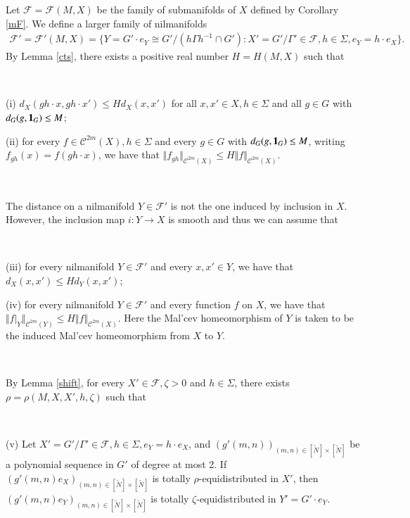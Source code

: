 \documentclass[12pt,amstex]{amsart}
\theoremstyle{definition}
\begin{document}
Let $\mathcal{F}=\mathcal{F}(M,X)$ be the family of submanifolds of $X$ defined by Corollary \ref{mF}. We define a larger family of nilmanifolds
  \begin{equation}\nonumber
   \begin{split}
     \mathcal{F}'=\mathcal{F}'(M,X)=\{Y=G'\cdot e_{Y}\cong G'/(h\Gamma h^{-1}\cap G')\colon X'=G'/\Gamma'\in\mathcal{F}, h\in\Sigma, e_{Y}=h\cdot e_{X}\}.
   \end{split}
  \end{equation}
By Lemma \ref{cts}, there exists a positive real number $H=H(M,X)$ such that

\

(i) $d_{X}(gh\cdot x,gh\cdot x')\leq Hd_{X}(x,x')$ for all $x,x'\in X, h\in\Sigma$ and all $g\in G$ with $d_{G}(g,\bold{1}_{G})\leq M$;

(ii) for every $f\in\mathcal{C}^{2m}(X), h\in\Sigma$ and every $g\in G$ with $d_{G}(g,\bold{1}_{G})\leq M$, writing $f_{gh}(x)=f(gh\cdot x)$, we have that $\Vert f_{gh}\Vert_{\mathcal{C}^{2m}(X)}\leq H\Vert f\Vert_{\mathcal{C}^{2m}(X)}$.

\

The distance on a nilmanifold $Y\in\mathcal{F}'$ is not the one induced by inclusion in $X$. However, the inclusion map $i\colon Y\rightarrow X$ is smooth and thus we can assume that

\

(iii) for every nilmanifold $Y\in\mathcal{F}'$ and every $x,x'\in Y$, we have that $d_{X}(x,x')\leq H d_{Y}(x,x')$;

(iv) for every nilmanifold $Y\in\mathcal{F}'$ and every function $f$ on $X$, we have that $\Vert f|_{Y}\Vert_{\mathcal{C}^{2m}(Y)}\leq H\Vert f\Vert_{\mathcal{C}^{2m}(X)}$. Here the Mal'cev homeomorphism of $Y$ is taken to be the induced Mal'cev homeomorphism from $X$ to $Y$.

\

By Lemma \ref{shift}, for every $X'\in\mathcal{F},\zeta>0$ and $h\in\Sigma$, there exists $\rho=\rho(M,X,X',h,\zeta)$ such that

\

(v) Let $X'=G'/\Gamma'\in\mathcal{F},h\in\Sigma, e_{Y}=h\cdot e_{X}$, and $(g'(m,n))_{(m,n)\in[\tilde{N}]\times[\tilde{N}]}$ be a polynomial sequence in $G'$ of degree at most 2. If $(g'(m,n)e_{X})_{(m,n)\in[\tilde{N}]\times[\tilde{N}]}$ is totally $\rho$-equidistributed in $X'$, then $(g'(m,n)e_{Y})_{(m,n)\in[\tilde{N}]\times[\tilde{N}]}$ is totally $\zeta$-equidistributed in $Y'=G'\cdot e_{Y}$.
\end{document}
